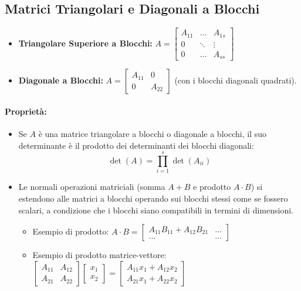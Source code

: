 \documentclass[a4paper,12pt]{article}
\begin{document}
	\subsection{Matrici Triangolari e Diagonali a Blocchi}
	\begin{itemize}
		\item \textbf{Triangolare Superiore a Blocchi:} $A = \begin{bmatrix} A_{11} & \dots & A_{1s} \\ 0 & \ddots & \vdots \\ 0 & \dots & A_{ss} \end{bmatrix}$
		\item \textbf{Diagonale a Blocchi:} $A = \begin{bmatrix} A_{11} & 0 \\ 0 & A_{22} \end{bmatrix}$ (con i blocchi diagonali quadrati).
	\end{itemize}
	
	\paragraph{Proprietà:}
	\begin{itemize}
		\item Se $A$ è una matrice triangolare a blocchi o diagonale a blocchi, il suo determinante è il prodotto dei determinanti dei blocchi diagonali:
		\begin{equation}
			\det(A) = \prod_{i=1}^{s} \det(A_{ii})
		\end{equation}
		\item Le normali operazioni matriciali (somma $A+B$ e prodotto $A \cdot B$) si estendono alle matrici a blocchi operando sui blocchi stessi come se fossero scalari, a condizione che i blocchi siano compatibili in termini di dimensioni.
		\begin{itemize}
			\item Esempio di prodotto: $A \cdot B = \begin{bmatrix} A_{11}B_{11} + A_{12}B_{21} & \dots \\ \dots & \dots \end{bmatrix}$
			\item Esempio di prodotto matrice-vettore: $\begin{bmatrix} A_{11} & A_{12} \\ A_{21} & A_{22} \end{bmatrix} \begin{bmatrix} x_1 \\ x_2 \end{bmatrix} = \begin{bmatrix} A_{11}x_1 + A_{12}x_2 \\ A_{21}x_1 + A_{22}x_2 \end{bmatrix}$
		\end{itemize}
	\end{itemize}
	
\end{document}
